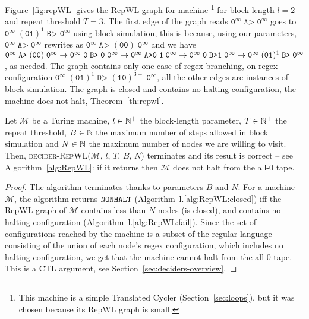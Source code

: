 \begin{example}\label{ex:repWL}
    Figure~\ref{fig:repWL} gives the RepWL graph for machine \footnote{This machine is a simple Translated Cycler (Section~\ref{sec:loops}), but it was chosen because its RepWL graph is small.} for block length $l=2$ and repeat threshold $T=3$. The first edge of the graph reads $\texttt{0}^\infty\; \texttt{A>}\;\texttt{0}^\infty$ goes to $\texttt{0}^\infty\; (\texttt{01})^1\; \texttt{B>}\; \texttt{0}^\infty$ using block simulation, this is because, using our parameters, $\texttt{0}^\infty\; \texttt{A>}\;\texttt{0}^\infty$ rewrites as $\texttt{0}^\infty\; \texttt{A>}\; (\texttt{00})\;\texttt{0}^\infty$ and we have $\texttt{0}^\infty\; \texttt{A>}\; (\texttt{00})\;\texttt{0}^\infty \to \texttt{0}^\infty\;  \texttt{0}\; \texttt{B>}\;\texttt{0}\;\texttt{0}^\infty \to \texttt{0}^\infty\;  \texttt{A>}\texttt{0}\;\texttt{1}\;\texttt{0}^\infty \to \texttt{0}^\infty\;  \texttt{0}\;\texttt{B>}\texttt{1}\;\texttt{0}^\infty \to  \texttt{0}^\infty\; (\texttt{01})^1\; \texttt{B>}\; \texttt{0}^\infty$, as needed. The graph contains only one case of regex branching, on regex configuration $\texttt{0}^\infty\; (\texttt{01})^1\; \texttt{D>}\; (\texttt{10})^{3+}\; \texttt{0}^\infty$, all the other edges are instances of block simulation. The graph is closed and contains no halting configuration, the machine does not halt, Theorem~\ref{th:repwl}.
\end{example}


\begin{theorem}\label{th:repwl}
    Let $\mathcal{M}$ be a Turing machine, $l\in \mathbb{N}^+$ the block-length parameter, $T \in \mathbb{N}^+$ the repeat threshold, $B \in \mathbb{N}$ the maximum number of steps allowed in block simulation and $N \in \mathbb{N}$ the maximum number of nodes we are willing to visit. Then, \textsc{decider-RepWL}($\mathcal{M}$, $l$, $T$, $B$, $N$) terminates and its result is correct -- see Algorithm~\ref{alg:RepWL}: if it returns \NONHALT then $\mathcal{M}$ does not halt from the all-$0$ tape.
\end{theorem}
\begin{proof}
    The algorithm terminates thanks to parameters $B$ and $N$. For a machine $\mathcal{M}$, the algorithm returns $\texttt{NONHALT}$ (Algorithm~l.\ref{alg:RepWL:closed}) iff the RepWL graph of $\mathcal{M}$ contains less than $N$ nodes (\ie is closed), and contains no halting configuration (Algorithm~l.\ref{alg:RepWL:fail}). Since the set of configurations reached by the machine is a subset of the regular language consisting of the union of each node's regex configuration, which includes no halting configuration, we get that the machine cannot halt from the all-0 tape. This is a CTL argument, see Section~\ref{sec:deciders-overview}.
\end{proof}


